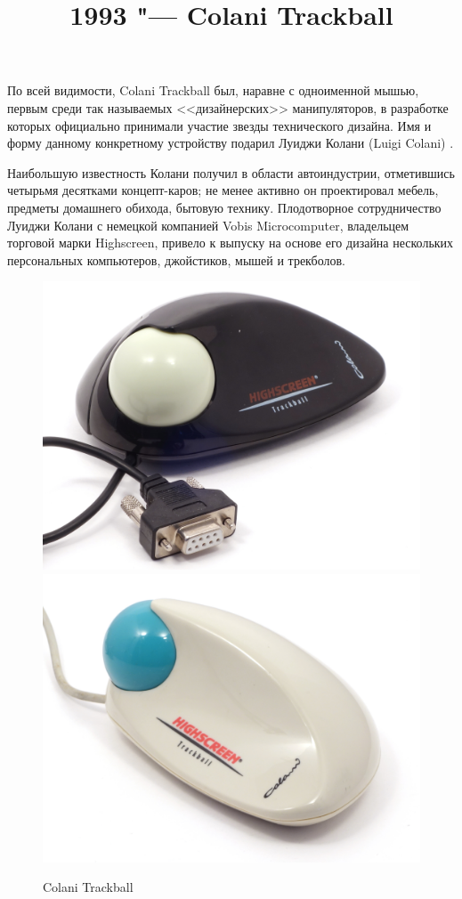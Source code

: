 \documentclass[11pt, a4paper]{article}
\begin{document}
\title{1993 "--- Colani Trackball}
\date{}
\maketitle

По всей видимости, Colani Trackball был, наравне с одноименной мышью, первым среди так называемых <<дизайнерских>> манипуляторов, в разработке которых официально принимали участие звезды технического дизайна. Имя и форму данному конкретному устройству подарил Луиджи Колани (Luigi Colani) \cite{wiki}.

{Наибольшую известность Колани получил в области автоиндустрии, отметившись четырьмя десятками концепт-каров; не менее активно он проектировал мебель, предметы домашнего обихода, бытовую технику. Плодотворное сотрудничество Луиджи Колани с немецкой компанией Vobis Microcomputer, владельцем торговой марки Highscreen, привело к выпуску на основе его дизайна нескольких персональных компьютеров, джойстиков, мышей и трекболов.}

\begin{figure}[h]
    \centering
    \includegraphics[scale=0.46]{1993_colani_trackball/pic_b_60.jpg}
    \includegraphics[scale=0.46]{1993_colani_trackball/pic_w_60.jpg}
    \caption{Colani Trackball}
    \label{fig:ColaniPic}
\end{figure}
\end{document}
